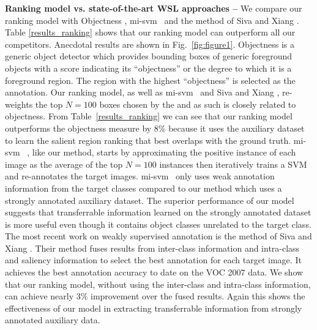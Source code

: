 \documentclass{bmvc2k}
\def\misvm{{\sc mi-svm}}
\begin{document}
\noindent \textbf{Ranking model vs. state-of-the-art WSL approaches --} We compare our ranking model with Objectness \citep{Alexewhatisobject}, \misvm~\cite{Andrews03supportvector} and the method of Siva and Xiang \cite{Sivaiccv2011}. Table \ref{results_ranking} shows that our ranking model can outperform all our competitors. Anecdotal results are shown in Fig.~\ref{fig:figure1}.
Objectness \cite{Alexewhatisobject} is a generic object detector which provides bounding boxes of generic foreground objects with a score indicating its ``objectness'' or the degree to which it is a foreground region. The region with the highest ``objectness'' is selected as the annotation. Our ranking model, as well as \misvm~\citep{Andrews03supportvector} and  Siva and Xiang \cite{Sivaiccv2011}, re-weights the top $N=100$ boxes chosen by the \cite{Alexewhatisobject} and as such is closely related to objectness. From Table~\ref{results_ranking} we can see that our ranking model outperforms the objectness measure by 8\% because it uses the auxiliary dataset to learn the salient region ranking that best overlaps with the ground truth. \misvm~ \cite{Andrews03supportvector}, like our method, starts by approximating the positive instance of each image as the average of the top $N=100$ instances then iteratively trains a SVM and re-annotates the target images. \misvm~ only uses weak annotation information from the target classes compared to our method which uses a strongly annotated auxiliary dataset. The superior performance of our model suggests that transferrable information learned on the strongly annotated dataset is more useful even though it contains object classes unrelated to the target class.
The most recent work on weakly supervised annotation is the method of Siva and Xiang \cite{Sivaiccv2011}. Their method fuses results from inter-class information and intra-class and saliency information to select the best annotation for each target image. It achieves the best annotation accuracy to date on the VOC 2007 data. We show that our ranking model, without using the inter-class and intra-class information, can achieve nearly 3\% improvement over the fused results. Again this shows the effectiveness of our model in extracting transferrable information from strongly annotated auxiliary data. 
\end{document}
